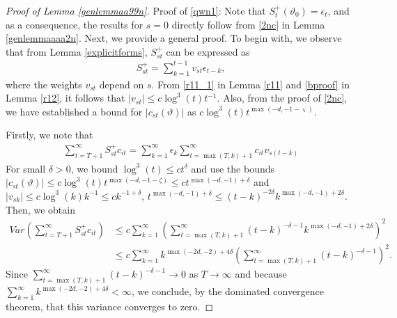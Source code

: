 {{\begin{proof}[Proof of Lemma \ref{genlemmaa99n}] Proof of \eqref{qwn1}: Note that $S_{t}^+(\vartheta_0) = \epsilon_t $, and as a consequence, the results for $s = 0$ directly follow from \eqref{2nc} in Lemma \ref{genlemmaaaa2n}.
Next, we provide a general proof. To begin with, we observe that from Lemma \ref{explicitforms}, $S_{st}^+$ can be expressed as
\begin{align*}
   S_{st}^+ = \sum_{k = 1}^{t-1} v_{st} \epsilon_{t-k}, 
\end{align*}
where the weights $v_{st}$ depend on $s$. From \eqref{r11_1} in Lemma \ref{r11} and \eqref{bproof} in Lemma \ref{r12}, it follows that $|v_{st}| \leq c \log^3(t) t^{-1}$. Also, from the proof of \eqref{2nc}, we have established a bound for $|c_{st}(\vartheta)|$ as $c \log^3(t) t^{\max(-d,-1-\varsigma)}$. 

Firstly, we note that 
\begin{align*}
    \sum_{t = T+1}^{\infty} S_{s t}^+ c_{it}=  \sum_{k = 1}^{\infty} \epsilon_k \sum_{t = \max(T,k)+1}^{\infty}  c_{it} v_{s(t-k)}  
\end{align*}
For small $\delta>0$, we bound $\log^3(t) \leq c t^{\delta}$ and use the bounds $|c_{st}(\vartheta)| \leq c \log^3(t) t^{\max(-d,-1-\zeta)} \leq c t^{\max(-d,-1)+\delta}$ and $|v_{s k}| \leq c \log^3(k) k^{-1} \leq c k^{-1+\delta}$, $t^{\max(-d,-1)+\delta} \leq (t-k)^{-2\delta} k^{\max(-d,-1)+2\delta}$. Then, we obtain
\begin{align*}
    Var\left( \sum_{t = T+1}^{\infty} S_{s t}^+ c_{it} \right) &\leq  c \sum_{k = 1}^{\infty}  \left( \sum_{t = \max(T,k)+1}^{\infty}  (t-k)^{-\delta-1} k^{\max(-d,-1)+2\delta}  \right)^2 \\
    &\leq c \sum_{k = 1}^{\infty} k^{\max(-2d,-2)+4\delta}  \left( \sum_{t = \max(T,k)+1}^{\infty}  (t-k)^{-\delta-1}   \right)^2. 
\end{align*}
Since $\sum_{t = \max(T,k)+1}^{\infty} (t-k)^{-\delta-1} \rightarrow 0$ as $T \rightarrow \infty$ and because $\sum_{k = 1}^{\infty} k^{\max(-2d,-2)+4\delta} < \infty$, we conclude, by the dominated convergence theorem, that this variance converges to zero.
\end{proof}


}}
